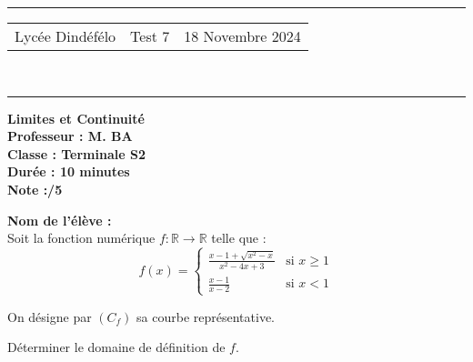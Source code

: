 \documentclass[a4paper,12pt]{article}
\begin{document}
\hrule %
\begin{center}
    \begin{tabular}{@{} p{5cm} p{5cm} p{5cm} @{}} %
        Lycée Dindéfélo & \quad\quad Test 7 & 18 Novembre 2024 \\
    \end{tabular}
    \\[-0.01cm] %
    \hrule %
\end{center}
\begin{center}
    \textbf{\Large Limites et Continuité} \\[0.2cm]
    \textbf{\large Professeur : M. BA} \\[0.2cm]
    \textbf{Classe : Terminale S2} \\[0.2cm]
    \textbf{\small Durée : 10 minutes} \\[0.2cm]
    \textbf{\small Note :\quad\quad /5}
\end{center}

\textbf{\small Nom de l'élève :} \underline{\hspace{8cm}} \\[0.5cm]

Soit la fonction numérique \( f : \mathbb{R} \to \mathbb{R} \) telle que :
\[
f(x) = 
\begin{cases} 
\frac{x - 1 + \sqrt{x^2 - x}}{x^2 - 4x + 3} & \text{si } x \geq 1 \\
\frac{x - 1}{x - 2} & \text{si } x < 1 
\end{cases}
\]

On désigne par \( (C_f) \) sa courbe représentative.

Déterminer le domaine de définition de $f$.
\end{document}
